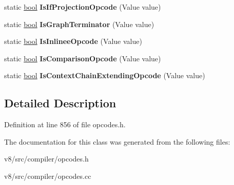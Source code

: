 \begin{DoxyCompactItemize}
static \mbox{\hyperlink{classbool}{bool}} {\bfseries Is\+If\+Projection\+Opcode} (Value value)
\item 
\mbox{\label{classv8_1_1internal_1_1compiler_1_1IrOpcode_a2b7c019661bce2793c182b8b6d9aadc5}} 
static \mbox{\hyperlink{classbool}{bool}} {\bfseries Is\+Graph\+Terminator} (Value value)
\item 
\mbox{\label{classv8_1_1internal_1_1compiler_1_1IrOpcode_a7f0be422453152d34c2917579c7ba5f8}} 
static \mbox{\hyperlink{classbool}{bool}} {\bfseries Is\+Inlinee\+Opcode} (Value value)
\item 
\mbox{\label{classv8_1_1internal_1_1compiler_1_1IrOpcode_ab349a2fcedbfaabdccaa50d98e44dba3}} 
static \mbox{\hyperlink{classbool}{bool}} {\bfseries Is\+Comparison\+Opcode} (Value value)
\item 
\mbox{\label{classv8_1_1internal_1_1compiler_1_1IrOpcode_a0daa6a590ec5050ae269afb9fb00f9c2}} 
static \mbox{\hyperlink{classbool}{bool}} {\bfseries Is\+Context\+Chain\+Extending\+Opcode} (Value value)
\end{DoxyCompactItemize}


\subsection{Detailed Description}


Definition at line 856 of file opcodes.\+h.



The documentation for this class was generated from the following files\+:\begin{DoxyCompactItemize}
\item 
v8/src/compiler/opcodes.\+h\item 
v8/src/compiler/opcodes.\+cc\end{DoxyCompactItemize}
